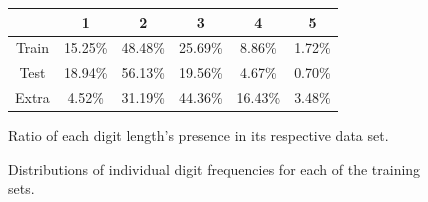 \documentclass[12pt]{article}
\begin{document}
\begin{figure}[!htb]
\begin{center}
\begin{tabular}{ |c|c|c|c|c|c| }
\hline
       & 1       & 2       & 3       & 4       & 5       \\
\hline
Train  & 15.25\% & 48.48\% & 25.69\% & 8.86\%  & 1.72\%  \\
\hline
Test   & 18.94\% & 56.13\% & 19.56\% & 4.67\%  & 0.70\%  \\
\hline
Extra  & 4.52\%  & 31.19\% & 44.36\% & 16.43\% & 3.48\%  \\
\hline
\end{tabular}
\end{center}
\caption{Ratio of each digit length's presence in its respective data set.}
\label{fig:digit_length_table}
\end{figure}



\begin{figure}[!htb]
\centering
{}\hfill
{}\hfill
{}\hfill
\caption{Distributions of individual digit frequencies for each of the training sets.}
\label{fig:digit_freq_plots}
\end{figure}
\end{document}
